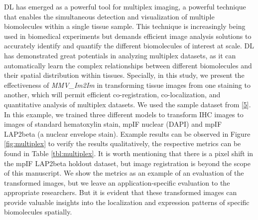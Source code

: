 DL has emerged as a powerful tool for multiplex imaging, a powerful technique that enables the simultaneous detection and visualization of multiple biomolecules within a single tissue sample. This technique is increasingly being used in biomedical experiments but demands efficient image analysis solutions to accurately identify and quantify the different biomolecules of interest at scale. DL has demonstrated great potentials in analyzing multiplex datasets, as it can automatically learn the complex relationships between different biomolecules and their spatial distribution within tissues. Specially, in this study, we present the effectiveness of \emph{MMV\_Im2Im} in transforming tissue images from one staining to another, which will permit efficient co-registration, co-localization, and quantitative analysis of multiplex datasets. We used the sample dataset from {[}\protect\hyperlink{ref-WwenuBHa}{5}{]}. In this example, we trained three different models to transform IHC images to images of standard hematoxylin stain, mpIF nuclear (DAPI) and mpIF LAP2beta (a nuclear envelope stain). Example results can be observed in Figure \ref{fig:multiplex} to verify the results qualitatively, the respective metrics can be found in Table \ref{tbl:multiplex}. It is worth mentioning that there is a pixel shift in the mpIF LAP2beta holdout dataset, but image registration is beyond the scope of this manuscript. We show the metrics as an example of an evaluation of the transformed images, but we leave an application-specific evaluation to the appropriate researchers. But it is evident that these transformed images can provide valuable insights into the localization and expression patterns of specific biomolecules spatially.

